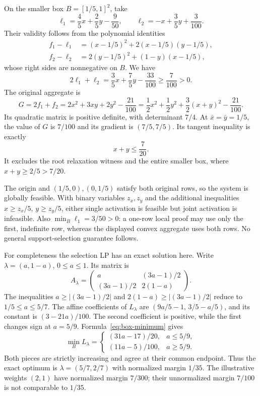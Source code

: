 On the smaller box $B=[1/5,1]^2$, take
\[
 \ell_1=\frac45x+\frac25y-\frac9{50},\qquad
 \ell_2=-x+\frac35y+\frac3{100}.
\]
Their validity follows from the polynomial identities
\[
 \begin{split}
 f_1-\ell_1&=(x-1/5)^2+2(x-1/5)(y-1/5),\\
 f_2-\ell_2&=2(y-1/5)^2+(1-y)(x-1/5),
 \end{split}
\]
whose right sides are nonnegative on $B$. We have
\[
 2\ell_1+\ell_2=\frac35x+\frac75y-\frac{33}{100}
                         \geq\frac7{100}>0.
\]
The original aggregate is
\[
 G=2f_1+f_2=2x^2+3xy+2y^2-\frac{21}{100}
   =\frac12x^2+\frac12y^2+\frac32(x+y)^2-\frac{21}{100}.
\]
Its quadratic matrix is positive definite, with determinant $7/4$.
At $\bar x=\bar y=1/5$, the value of $G$ is $7/100$ and its
gradient is $(7/5,7/5)$. Its tangent inequality is exactly
\begin{equation}\label{eq:repair-tangent}
 x+y\leq\frac7{20}.
\end{equation}
It excludes the root relaxation witness and the entire smaller box,
where $x+y\geq2/5>7/20$.

The origin and $(1/5,0),(0,1/5)$ satisfy both original rows, so the
system is globally feasible. With binary variables $z_x,z_y$ and
the additional inequalities $x\geq z_x/5$, $y\geq z_y/5$, either
single activation is feasible but joint activation is infeasible.
Also $\min_B\ell_1=3/50>0$: a one-row local proof may use only
the first, indefinite row, whereas the displayed convex aggregate
uses both rows. No general support-selection guarantee follows.

For completeness the selection LP has an exact solution here.
Write $\lambda=(a,1-a)$, $0\leq a\leq1$. Its matrix is
\[
 A_\lambda=\begin{pmatrix}
 a&(3a-1)/2\\(3a-1)/2&2(1-a)
 \end{pmatrix}.
\]
The inequalities $a\geq|(3a-1)/2|$ and
$2(1-a)\geq|(3a-1)/2|$ reduce to
$1/5\leq a\leq5/7$.
The affine coefficients of $L_\lambda$ are
$(9a/5-1,\,3/5-a/5)$, and its constant is $(3-21a)/100$.
The second coefficient is positive, while the first changes sign
at $a=5/9$. Formula~\eqref{eq:box-minimum} gives
\[
 \min_B L_\lambda=
 \begin{cases}
 (31a-17)/20,&a\leq5/9,\\
 (11a-5)/100,&a\geq5/9.
 \end{cases}
\]
Both pieces are strictly increasing and agree at their common
endpoint. Thus the exact optimum is
$\lambda=(5/7,2/7)$ with normalized margin $1/35$.
The illustrative weights $(2,1)$ have normalized margin $7/300$;
their unnormalized margin $7/100$ is not comparable to $1/35$.

